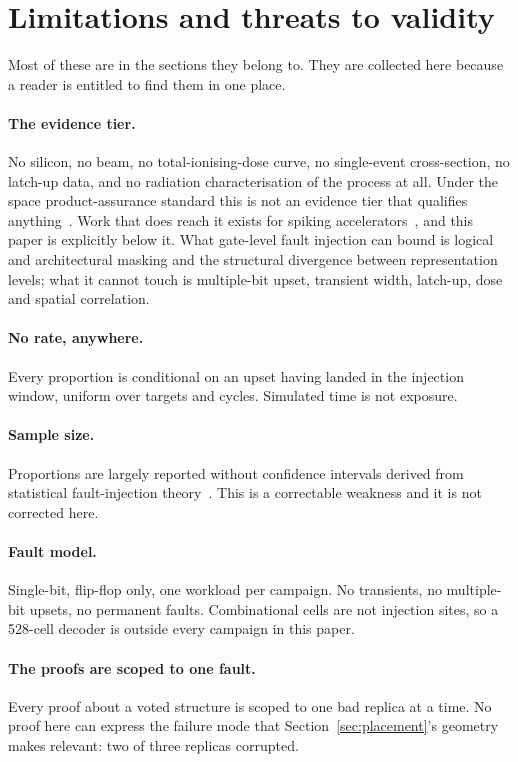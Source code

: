 \documentclass[11pt,a4paper]{article}
\begin{document}
\section{Limitations and threats to validity}
\label{sec:limits}

Most of these are in the sections they belong to. They are collected here
because a reader is entitled to find them in one place.

\paragraph{The evidence tier.}
No silicon, no beam, no total-ionising-dose curve, no single-event
cross-section, no latch-up data, and no radiation characterisation of the
process at all. Under the space product-assurance standard this is not an
evidence tier that qualifies anything~\cite{ecss60_15c}. Work that does
reach it exists for spiking accelerators~\cite{nijsink2026}, and this
paper is explicitly below it. What gate-level fault injection can bound
is logical and architectural masking and the structural divergence
between representation levels; what it cannot touch is multiple-bit
upset, transient width, latch-up, dose and spatial correlation.

\paragraph{No rate, anywhere.}
Every proportion is conditional on an upset having landed in the
injection window, uniform over targets and cycles. Simulated time is not
exposure.

\paragraph{Sample size.}
Proportions are largely reported without confidence intervals derived
from statistical fault-injection theory~\cite{leveugle2009}. This is a
correctable weakness and it is not corrected here.

\paragraph{Fault model.}
Single-bit, flip-flop only, one workload per campaign. No transients, no
multiple-bit upsets, no permanent faults. Combinational cells are not
injection sites, so a 528-cell decoder is outside every campaign in this
paper.

\paragraph{The proofs are scoped to one fault.}
Every proof about a voted structure is scoped to one bad replica at a
time. No proof here can express the failure mode that
Section~\ref{sec:placement}'s geometry makes relevant: two of three
replicas corrupted.
\end{document}

